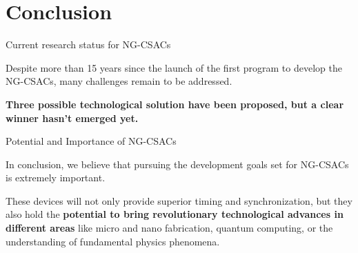 \section{Conclusion}

\begin{frame}{Current research status for NG-CSACs}

    Despite more than 15 years since the launch of the first program to develop the NG-CSACs, many challenges remain to be addressed.

    \vspace{10pt}

    \textbf{Three possible technological solution have been proposed, but a clear winner hasn't emerged yet.}

\end{frame}



\begin{frame}{Potential and Importance of NG-CSACs}

    In conclusion, we believe that pursuing the development goals set for NG-CSACs is extremely important.

    \vspace{10pt}

    These devices will not only provide superior timing and synchronization, but they also hold the \textbf{potential to bring revolutionary technological advances in different areas} like micro and nano fabrication, quantum computing, or the understanding of fundamental physics phenomena.

\end{frame}